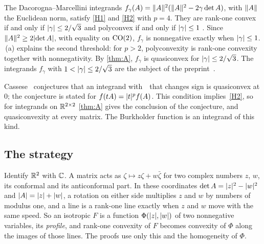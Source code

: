 The Dacorogna--Marcellini integrands
$f_\gamma(A)=\lVert A\rVert^2(\lVert A\rVert^2-2\gamma\det A)$, with $\lVert A\rVert$ the Euclidean norm, satisfy
\ref{H1} and \ref{H2} with $p=4$. They are rank-one convex if and only if
$\lvert \gamma\rvert\le2/\sqrt3$ and polyconvex if and only if $\lvert \gamma\rvert\le1$
\cite{DacorognaMarcellini1988,AlibertDacorogna1992}. Since $\lVert A\rVert^2\ge2\lvert \det A\rvert$, with
equality on $\mathrm{CO}(2)$, $f_\gamma$ is nonnegative exactly when $\lvert \gamma\rvert\le1$.
\,(a) explains the second threshold: for $p>2$, polyconvexity is rank-one
convexity together with nonnegativity. By \cref{thm:A}, $f_\gamma$ is quasiconvex for
$\lvert \gamma\rvert\le2/\sqrt3$. The integrands $f_\gamma$ with $1<\lvert \gamma\rvert\le2/\sqrt3$ are the
subject of the preprint~\cite{BrunoPasqualotto2026}.

Cassese~\cite[Conjecture~1]{Cassese2026} conjectures that an integrand with~\Hyp\ that changes
sign is quasiconvex at $0$; the conjecture is stated for $f(tA)=\lvert t\rvert^pf(A)$. This condition
implies~\ref{H2}, so for integrands on $\mathbb{R}^{2\times 2}$ \cref{thm:A} gives the conclusion of the conjecture,
and quasiconvexity at every matrix. The Burkholder function is an integrand of this kind.

\subsection{The strategy}\label{sec:strategy}

Identify $\mathbb{R}^2$ with $\mathbb{C}$. A matrix acts as $\zeta\mapsto z\zeta+w\bar\zeta$ for two complex
numbers $z$, $w$, its conformal and its anticonformal part. In these coordinates
$\det A=\lvert z\rvert^2-\lvert w\rvert^2$ and $\lvert A\rvert=\lvert z\rvert+\lvert w\rvert$, a rotation on either side multiplies $z$
and $w$ by numbers of modulus one, and a line is a rank-one line exactly when $z$ and $w$ move
with the same speed. So an isotropic $F$ is a function $\Phi(\lvert z\rvert,\lvert w\rvert)$ of two nonnegative
variables, its \emph{profile}, and rank-one convexity of $F$ becomes convexity of $\Phi$ along
the images of those lines. The proofs use only this and the homogeneity of $\Phi$.

